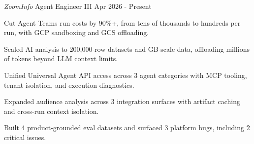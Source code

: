 

\begin{cventries}
 \cventry
    {\emph{ZoomInfo}} %
    {Agent Engineer III} %
    {} %
    {Apr 2026 - Present} %
    {
    \begin{cvitems} %
        \item {Cut Agent Teams run costs by 90\%+, from tens of thousands to hundreds per run, with GCP sandboxing and GCS offloading.}
        \item {Scaled AI analysis to 200,000-row datasets and GB-scale data, offloading millions of tokens beyond LLM context limits.}
        \item {Unified Universal Agent API access across 3 agent categories with MCP tooling, tenant isolation, and execution diagnostics.}
        \item {Expanded audience analysis across 3 integration surfaces with artifact caching and cross-run context isolation.}
        \item {Built 4 product-grounded eval datasets and surfaced 3 platform bugs, including 2 critical issues.}
    \end{cvitems}
}


\end{cventries}
